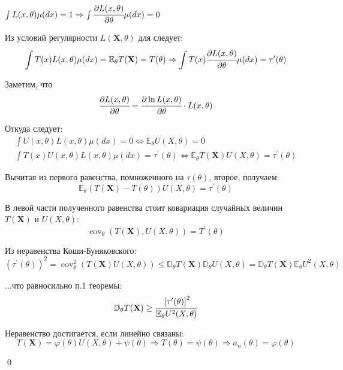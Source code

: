 \documentclass[oneside,final,14pt]{extreport}
\renewenvironment{proof}{{\bfseries Доказательство.}}{\qed}
\theoremstyle{definition}
\begin{document}
\begin{proof}
$\int L(x, \theta) \mu(d x)=1 \Rightarrow \int \cfrac{\partial L(x, \theta)}{\partial \theta} \mu(d x)=0$

Из условий регулярности $L(\mathbf{X}, \theta)$ для следует:
\begin{equation*}
    \int T(x) L(x, \theta) \mu(d x)=\mathbb{E}_{\theta} T(\mathbf{X})=T(\theta) \Rightarrow \int T(x) \cfrac{\partial L(x, \theta)}{\partial \theta} \mu(d x)=\tau^{\prime}(\theta)
\end{equation*}

Заметим, что
\begin{equation*}
    \cfrac{\partial L(x, \theta)}{\partial \theta}=\cfrac{\partial \ln L(x, \theta)}{\partial \theta} \cdot L(x, \theta)
\end{equation*}

Откуда следует:
\begin{gather*}
    \int U(x, \theta) L(x, \theta) \mu(d x)=0 \Leftrightarrow \mathbb{E}_{\theta} U(X, \theta)=0 \\
\int T(x) U(x, \theta) L(x, \theta) \mu(d x)=\tau^{\prime}(\theta) \Leftrightarrow \mathbb{E}_{\theta} T(\mathbf{X}) U(X, \theta)=\tau^{\prime}(\theta)
\end{gather*}

Вычитая из первого равенства, помноженного на $\tau(\theta)$, второе, получаем:
\begin{equation*}
    \mathbb{E}_{\theta}(T(\mathbf{X})-T(\theta)) U(X, \theta)=\tau^{\prime}(\theta)
\end{equation*}

В левой части полученного равенства стоит ковариация случайных величин $T(\mathbf{X})$ и $U(X,\theta)$:
\begin{equation*}
    \operatorname{cov}_{\theta}(T(\mathbf{X}), U(X, \theta))=T^{\prime}(\theta)
\end{equation*}

Из неравенства Коши-Буняковского:
\begin{equation*}
    \left(\tau^{\prime}(\theta)\right)^{2}=\operatorname{cov}_{\theta}^{2}(T(\mathbf{X}) U(X, \theta)) \leq \mathbb{D}_{\theta} T(\mathbf{X}) \mathbb{D}_{\theta} U(X, \theta)=\mathbb{D}_{\theta} T(\mathbf{X}) \mathbb{E}_{\theta} U^{2}(X, \theta)
\end{equation*}

...что равносильно п.1 теоремы:
\begin{equation*}
    \mathbb{D}_{\theta} T(\mathbf{X}) \geq \cfrac{\left[\tau^{\prime}(\theta)\right]^{2}}{\mathbb{E}_{\theta} U^{2}(X, \theta)}
\end{equation*}

Неравенство достигается, если линейно связаны:
\begin{equation*}
    T(\mathbf{X})=\varphi(\theta) U(X, \theta)+\psi(\theta) \Rightarrow T(\theta)=\psi(\theta) \Rightarrow a_{n}(\theta)=\varphi(\theta)
\end{equation*}

\end{proof}
\end{document}
